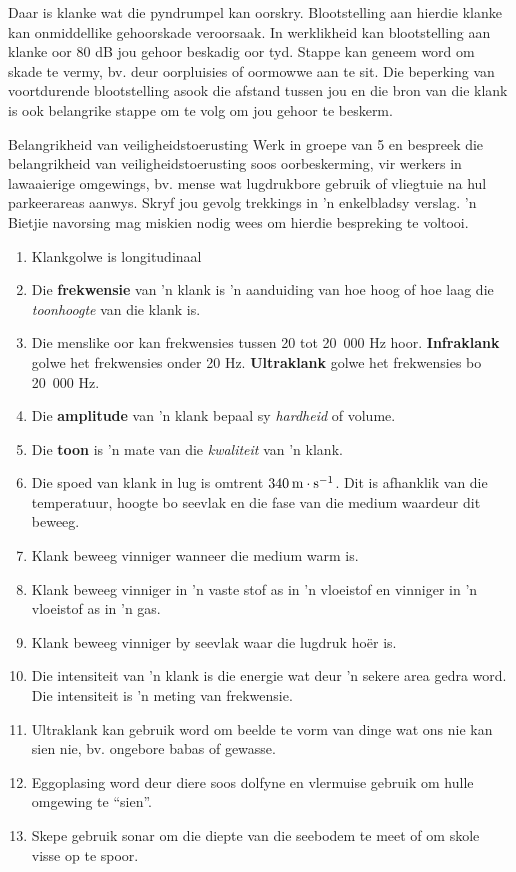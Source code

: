 Daar is klanke wat die pyndrumpel kan oorskry. Blootstelling aan hierdie klanke kan onmiddellike gehoorskade veroorsaak. In werklikheid kan blootstelling aan klanke oor 80 dB jou gehoor beskadig oor tyd. Stappe kan geneem word om skade te vermy, bv. deur oorpluisies of oormowwe aan te sit. Die beperking van voortdurende blootstelling asook die afstand tussen jou en die bron van die klank is ook belangrike stappe om te volg om jou gehoor te beskerm.\par

\pagebreak
\begin{groupdiscussion}{Belangrikheid van veiligheidstoerusting}
Werk in groepe van 5 en bespreek die belangrikheid van veiligheidstoerusting soos oorbeskerming, vir werkers in lawaaierige omgewings, bv. mense wat lugdrukbore gebruik of vliegtuie na hul parkeerareas aanwys. Skryf jou gevolg trekkings in 'n enkelbladsy verslag. 'n Bietjie navorsing mag miskien nodig wees om hierdie bespreking te voltooi.

\end{groupdiscussion} 
            \nopagebreak
\begin{enumerate}[noitemsep, label=\textbf{\arabic*}. ] 
    \item Klankgolwe is longitudinaal
    \item Die \textbf{frekwensie} van 'n klank is 'n aanduiding van hoe hoog of hoe laag die \textsl{toonhoogte} van die klank is.
    \item Die menslike oor kan frekwensies tussen 20 tot 20~000 Hz hoor. \textbf{Infraklank} golwe het frekwensies onder 20 Hz. \textbf{Ultraklank} golwe het frekwensies bo 20~000 Hz.
    \item Die \textbf{amplitude} van 'n klank bepaal sy \textsl{hardheid} of volume.
    \item Die \textbf{toon} is 'n mate van die \textsl{kwaliteit} van 'n klank.
    \item Die spoed van klank in lug is omtrent $340\phantom{\rule{2pt}{0ex}}\text{m}\ensuremath{\cdot}\text{s}{}^{-1}$. Dit is afhanklik van die temperatuur, hoogte bo seevlak en die fase van die medium waardeur dit beweeg.
    \item Klank beweeg vinniger wanneer die medium warm is.
    \item Klank beweeg vinniger in 'n vaste stof as in 'n vloeistof en vinniger in 'n vloeistof as in 'n gas.
    \item Klank beweeg vinniger by seevlak waar die lugdruk ho\"er is.
    \item Die intensiteit van 'n klank is die energie wat deur 'n sekere area gedra word. Die intensiteit is 'n meting van frekwensie.
    \item Ultraklank kan gebruik word om beelde te vorm van dinge wat ons nie kan sien nie, bv. ongebore babas of gewasse.
    \item Eggoplasing word deur diere soos dolfyne en vlermuise gebruik om hulle omgewing te ``sien''.
    \item Skepe gebruik sonar om die diepte van die seebodem te meet of om skole visse op te spoor.
\end{enumerate}
            


